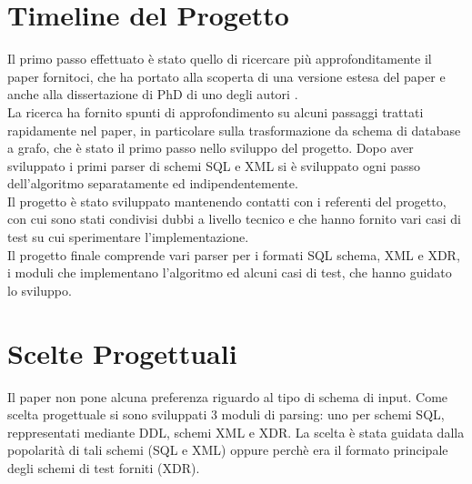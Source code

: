 \documentclass{article}
\begin{document}

\section{Timeline del Progetto}

Il primo passo effettuato è stato quello di ricercare più approfonditamente il paper fornitoci, che ha portato alla scoperta di una versione estesa del paper \cite{sfpaper_ext} e anche alla dissertazione di PhD di uno degli autori \cite{generic_model_man}.\\

La ricerca ha fornito spunti di approfondimento su alcuni passaggi trattati rapidamente nel paper, in particolare sulla trasformazione da schema di database a grafo, che è stato il primo passo nello sviluppo del progetto.
Dopo aver sviluppato i primi parser di schemi SQL e XML si è sviluppato ogni passo dell’algoritmo separatamente ed indipendentemente.\\

Il progetto è stato sviluppato mantenendo contatti con i referenti del progetto, con cui sono stati condivisi dubbi a livello tecnico e che hanno fornito vari casi di test su cui sperimentare l’implementazione.\\

Il progetto finale comprende vari parser per i formati SQL schema, XML e XDR, i moduli che implementano l’algoritmo ed alcuni casi di test, che hanno guidato lo sviluppo.\\


\section{Scelte Progettuali}
\label{Scelte Progettuali}

Il paper non pone alcuna preferenza riguardo al tipo di schema di input. Come scelta progettuale si sono sviluppati 3 moduli di parsing: uno per schemi SQL, reppresentati mediante DDL, schemi XML e XDR. La scelta è stata guidata dalla popolarità di tali schemi (SQL e XML) oppure perchè era il formato principale degli schemi di test forniti (XDR).\\
\end{document}
